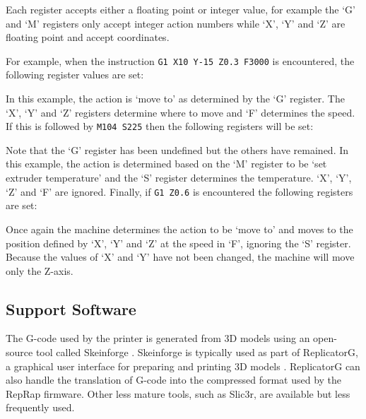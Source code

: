 			Each register accepts either a floating point or integer value, for
			example the `G' and `M' registers only accept integer action numbers while
			`X', `Y' and `Z' are floating point and accept coordinates.
			
			For example, when the instruction \verb|G1 X10 Y-15 Z0.3 F3000| is encountered,
			the following register values are set:
			
			\begin{gcoderegs}
			\end{gcoderegs}
			
			In this example, the action is `move to' as determined by the `G'
			register. The `X', `Y' and `Z' registers determine where to move and
			`F' determines the speed. If this is followed by \verb|M104 S225| then the
			following registers will be set:
			
			\begin{gcoderegs}
				\reg{F}{3000}
				\reg{M}{104}
				\reg{S}{225}
				\reg{X}{10}
				\reg{Y}{-15}
				\reg{Z}{0.3}
			\end{gcoderegs}
			
			Note that the `G' register has been undefined but the others have
			remained. In this example, the action is determined based on the `M'
			register to be `set extruder temperature' and the `S' register determines
			the temperature. `X', `Y', `Z' and `F' are ignored. Finally, if
			\verb|G1 Z0.6| is encountered the following registers are set:
			
			\begin{gcoderegs}
				\reg{G}{1}
				\reg{Z}{0.6}
			\end{gcoderegs}
			
			Once again the machine determines the action to be `move to' and moves to
			the position defined by `X', `Y' and `Z' at the speed in `F', ignoring the
			`S' register.  Because the values of `X' and `Y' have not been changed, the
			machine will move only the Z-axis.
		
		\subsection{Support Software}
			
			The G-code used by the printer is generated from 3D models using an
			open-source tool called Skeinforge \cite{skeinforge}. Skeinforge is
			typically used as part of ReplicatorG, a graphical user interface for
			preparing and printing 3D models \cite{replicatorg}. ReplicatorG can also
			handle the translation of G-code into the compressed format used by the
			RepRap firmware.  Other less mature tools, such as Slic3r, are available
			but less frequently used.
		
